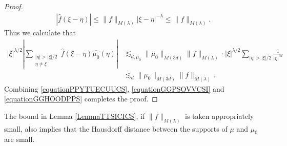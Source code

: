 \documentclass[dvipsnames,letterpaper,12pt]{article}
\numberwithin{equation}{section}
\numberwithin{theorem}{section}
\begin{document}
\begin{proof}
\begin{equation}
\begin{split}
        |\widehat{f}(\xi - \eta)| \leq  \| f \|_{M(\lambda)} |\xi - \eta|^{-\lambda} \leq \| f \|_{M(\lambda)}.
    \end{split}
    \end{equation}
    Thus we calculate that
    \begin{equation} \label{equationGGHOODPPS}
    \begin{split}
        |\xi|^{\lambda/2} \left| \sum_{\substack{|\eta| > |\xi|/2\\ \eta \neq \xi}} \widehat{f}(\xi - \eta) \widehat{\mu_0}(\eta) \right| &\lesssim_{d,\mu_0} \| \mu_0 \|_{M(3d)} \| f \|_{M(\lambda)} \cdot |\xi|^{\lambda/2} \sum_{|\eta| > |\xi|/2} \frac{1}{|\eta|^{3d}}\\
        &\lesssim_d \| \mu_0 \|_{M(3d)} \| f \|_{M(\lambda)}.
    \end{split}
    \end{equation}
    Combining \eqref{equationPPYTUECUUCS}, \eqref{equationGGPSOVVCSI} and \eqref{equationGGHOODPPS} completes the proof.
\end{proof}

The bound in Lemma \ref{LemmaTTSICICS}, if $\| f \|_{M(\lambda)}$ is taken appropriately small, also implies that the Hausdorff distance between the supports of $\mu$ and $\mu_0$ are small.
\end{document}
